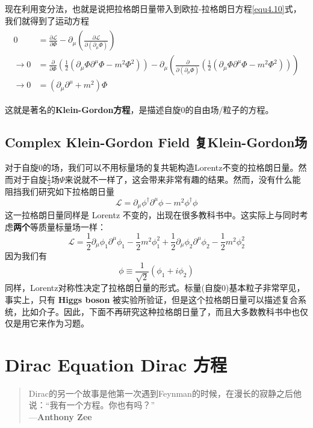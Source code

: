 现在利用变分法，也就是说把拉格朗日量带入到欧拉-拉格朗日方程\eqref{equ4.10}式，我们就得到了运动方程
\begin{align}
\label{equ6.5}
\begin{split}
0&=\frac{\partial\mathscr{L}}{\partial\Phi}-\partial_\mu\left(\frac{\partial\mathscr{L}}{\partial(\partial_\mu\Phi)}\right)\\
\rightarrow0&=\frac{\partial}{\partial\Phi}\left(\frac{1}{2}(\partial_\mu\Phi\partial^\mu\Phi-m^2\Phi^2)\right)-\partial_\mu\left(\frac{\partial}{\partial(\partial_\mu\Phi)}\left(\frac{1}{2}(\partial_\mu\Phi\partial^\mu\Phi-m^2\Phi^2)\right)\right) \\
\rightarrow0&=(\partial_\mu\partial^\mu+m^2)\Phi
\end{split}
\end{align}

这就是著名的{\bfseries Klein-Gordon方程}，是描述自旋$0$的自由场/粒子的方程。

\subsection[复Klein-Gordon场]{Complex Klein-Gordon Field \quad 复Klein-Gordon场}\label{sec6.2.1}

对于自旋$0$的场，我们可以不用标量场的复共轭构造Lorentz不变的拉格朗日量。然而对于自旋$\frac{1}{2}$场$\Psi$来说就不一样了，这会带来非常有趣的结果。然而，没有什么能阻挡我们研究如下拉格朗日量
\[\mathscr{L}=\partial_\mu\phi^\dagger\partial^\mu\phi-m^2\phi^\dagger\phi \]
这一拉格朗日量同样是 Lorentz 不变的，出现在很多教科书中。这实际上与同时考虑{\bfseries 两个}等质量标量场一样：
\[\mathscr{L}=\frac{1}{2}\partial_\mu\phi_1\partial^\mu\phi_1-\frac{1}{2}m^2\phi_1^2+\frac{1}{2}\partial_\mu\phi_2\partial^\mu\phi_2-\frac{1}{2}m^2\phi_2^2 \]
因为我们有
\[\phi\equiv\frac{1}{\sqrt2}(\phi_1+i\phi_2) \]
同样，Lorentz对称性决定了拉格朗日量的形式。标量(自旋$0$)基本粒子非常罕见，事实上，只有 {\bfseries Higgs boson} 被实验所验证，但是这个拉格朗日量可以描述复合系统，比如介子。因此，下面不再研究这种拉格朗日量了，而且大多数教科书中也仅仅是用它来作为习题。

\section[Dirac方程]{Dirac Equation \quad Dirac 方程}\label{sec6.3}
\begin{quote}
Dirac的另一个故事是他第一次遇到Feynman的时候，在漫长的寂静之后他说：“我有一个方程。你也有吗？”\\
\phantom{Dirac的另一个故事是他第一次遇到}---{\bfseries Anthony Zee}
\end{quote}

